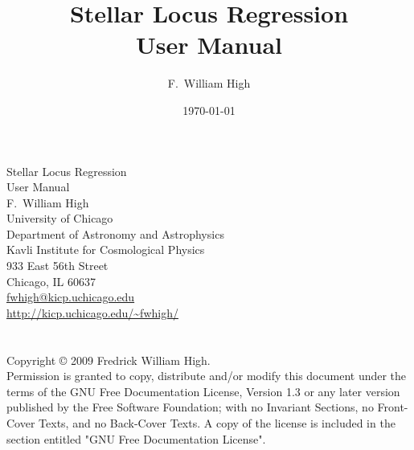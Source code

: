 \documentclass{report}
\begin{document}
\title{Stellar Locus Regression\\User Manual}

\author{F.\ William High}

\date{\today}



\begin{titlepage}
\begin{minipage}{\textwidth}
\begin{center}
\Huge
Stellar Locus Regression\\User Manual\\
\vspace{3cm}
\Large
F.~William High\\
\vspace{3cm}
\large
University of Chicago\\Department of Astronomy and Astrophysics\\Kavli
Institute for Cosmological Physics\\933 East 56th Street\\Chicago, IL 60637\\
\href{mailto:fwhigh@kicp.uchicago.edu}{fwhigh@kicp.uchicago.edu}\\
\url{http://kicp.uchicago.edu/~fwhigh/}
\end{center}
\end{minipage}
\end{titlepage}

\begin{minipage}{\textwidth}

\section*{}

Copyright \copyright{}  2009  Fredrick William High.\\
Permission is granted to copy, distribute and/or modify this document
under the terms of the GNU Free Documentation License, Version 1.3
or any later version published by the Free Software Foundation;
with no Invariant Sections, no Front-Cover Texts, and no Back-Cover Texts.
A copy of the license is included in the section entitled "GNU
Free Documentation License".



\end{minipage}
\end{document}
